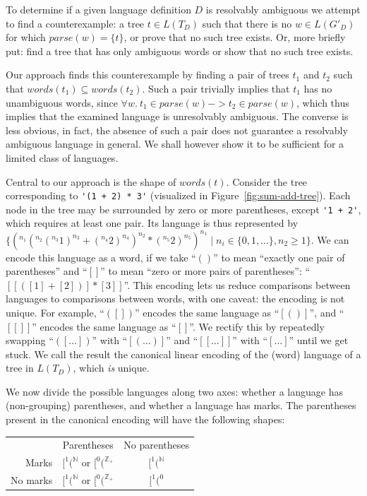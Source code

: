 \documentclass[runningheads]{llncs}
\newcommand{\parse}{\mathit{parse}} %
\newcommand{\words}{\mathit{words}} %
\newcommand{\reqpl}{(}
\newcommand{\reqpr}{)}
\newcommand{\reqp}[1]{\reqpl#1\reqpr}
\newcommand{\pospl}{[}
\newcommand{\pospr}{]}
\newcommand{\posp}[1]{\pospl#1\pospr}
\begin{document}
\noindent To determine if a given language definition $D$ is resolvably ambiguous we attempt to find a counterexample: a tree $t \in L(T_D)$ such that there is no $w \in L(G'_D)$ for which $\parse(w) = \{t\}$, or prove that no such tree exists. Or, more briefly put: find a tree that has only ambiguous words or show that no such tree exists.

Our approach finds this counterexample by finding a pair of trees $t_1$ and $t_2$ such that $\words(t_1) \subseteq \words(t_2)$. Such a pair trivially implies that $t_1$ has no unambiguous words, since $\forall w.\ t_1 \in \parse(w) -> t_2 \in \parse(w)$, which thus implies that the examined language is unresolvably ambiguous. The converse is less obvious, in fact, the absence of such a pair does not guarantee a resolvably ambiguous language in general. We shall however show it to be sufficient for a limited class of languages.

Central to our approach is the shape of $\words(t)$. Consider the tree corresponding to \verb|'(1 + 2) * 3'| (visualized in Figure~\ref{fig:sum-add-tree}). Each node in the tree may be surrounded by zero or more parentheses, except \verb|'1 + 2'|, which requires at least one pair. Its language is thus represented by $\{(^{n_1}(^{n_2}(^{n_3}1)^{n_3} + (^{n_4}2)^{n_4})^{n_2} * (^{n_5}2)^{n_5})^{n_1} \mid n_i \in \{0, 1, \ldots\}, n_2 \geq 1\}$. We can encode this language as a word, if we take ``$\reqp{}$'' to mean ``exactly one pair of parentheses'' and ``$\posp{}$'' to mean ``zero or more pairs of parentheses'': ``$\posp{\posp{\reqp{\posp{1} + \posp{2}}} * \posp{3}}$''. This encoding lets us reduce comparisons between languages to comparisons between words, with one caveat: the encoding is not unique. For example, ``$\reqp{\posp{}}$'' encodes the same language as ``$\posp{\reqp{}}$'', and ``$\posp{\posp{}}$'' encodes the same language as ``$\posp{}$''. We rectify this by repeatedly swapping ``$\reqp{\posp{\ldots}}$'' with ``$\posp{\reqp{\ldots}}$'' and ``$\posp{\posp{\ldots}}$'' with ``$\posp{\ldots}$'' until we get stuck. We call the result the canonical linear encoding of the (word) language of a tree in $L(T_D)$, which \emph{is} unique.

We now divide the possible languages along two axes: whether a language has (non-grouping) parentheses, and whether a language has marks. The parentheses present in the canonical encoding will have the following shapes:

\begin{center}
\begin{tabular}{r@{\quad}c@{\quad}c}
  & Parentheses & No parentheses \\
  \addlinespace
  Marks & $\pospl^1\reqpl^{\mathbb{N}}$ or $\pospl^0\reqpl^{\mathbb{Z}_{+}}$ & $\pospl^1\reqpl^{\mathbb{N}}$ \\
  No marks & $\pospl^1\reqpl^{\mathbb{N}}$ or $\pospl^0\reqpl^{\mathbb{Z}_{+}}$ & $\pospl^1\reqpl^0$ \\
\end{tabular}
\end{center}
\end{document}
